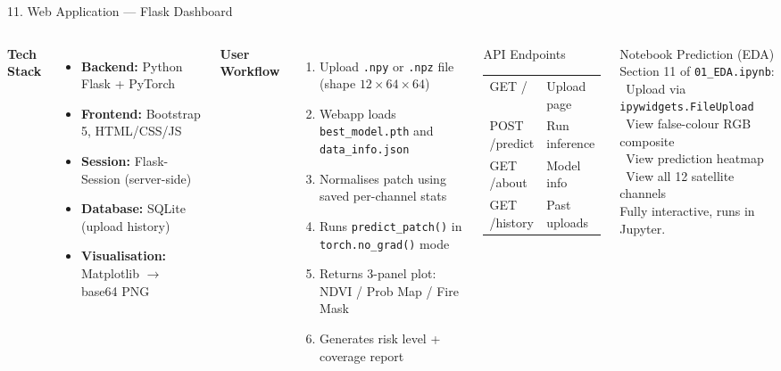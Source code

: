 ﻿\documentclass[aspectratio=169,t]{beamer}
\begin{document}
\begin{frame}{11. Web Application --- Flask Dashboard}
\begin{columns}[t]
\textcolor{accent}{\textbf{Tech Stack}}\\[0.1cm]
\small
\begin{itemize}
  \item \textbf{Backend:} Python Flask + PyTorch
  \item \textbf{Frontend:} Bootstrap 5, HTML/CSS/JS
  \item \textbf{Session:} Flask-Session (server-side)
  \item \textbf{Database:} SQLite (upload history)
  \item \textbf{Visualisation:} Matplotlib $\to$ base64 PNG
\end{itemize}
\vspace{0.2cm}
\textcolor{accentgreen}{\textbf{User Workflow}}
\begin{enumerate}\small
  \item Upload \texttt{.npy} or \texttt{.npz} file (shape $12\times64\times64$)
  \item Webapp loads \texttt{best\_model.pth} and \texttt{data\_info.json}
  \item Normalises patch using saved per-channel stats
  \item Runs \texttt{predict\_patch()} in \texttt{torch.no\_grad()} mode
  \item Returns 3-panel plot: NDVI / Prob Map / Fire Mask
  \item Generates risk level + coverage report
\end{enumerate}
\begin{block}{API Endpoints}
\small
\begin{tabular}{ll}
\textcolor{accent}{GET /}          & Upload page \\
\textcolor{accent}{POST /predict}  & Run inference \\
\textcolor{accent}{GET /about}     & Model info \\
\textcolor{accent}{GET /history}   & Past uploads \\
\end{tabular}
\end{block}
\vspace{0.2cm}
\begin{exampleblock}{Notebook Prediction (EDA)}
\small
Section 11 of \texttt{01\_EDA.ipynb}:\\
\textbullet\ Upload via \texttt{ipywidgets.FileUpload}\\
\textbullet\ View false-colour RGB composite\\
\textbullet\ View prediction heatmap\\
\textbullet\ View all 12 satellite channels\\
Fully interactive, runs in Jupyter.
\end{exampleblock}
\end{columns}
\end{frame}
\end{document}
